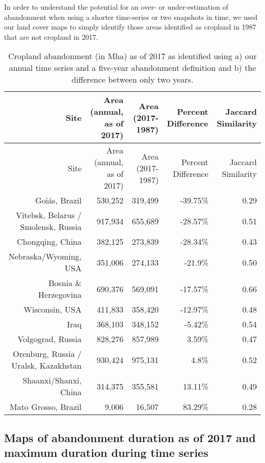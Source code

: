 \documentclass[9pt,twoside,lineno]{pnas-new}
\begin{document}
In order to understand the potential for an over- or under-estimation of abandonment when using a shorter time-series or two snapshots in time, we used our land cover maps to simply identify those areas identified as cropland in 1987 that are not cropland in 2017.

\newpage

\begin{longtable}[]{@{}rrrrr@{}}
\caption{\label{tab:twoyr-diff-table}Cropland abandonment (in Mha) as of 2017 as identified using a) our annual time series and a five-year abandonment definition and b) the difference between only two years.}\tabularnewline
\toprule
Site & Area (annual, as of 2017) & Area (2017-1987) & Percent Difference & Jaccard Similarity \\
\midrule
\endfirsthead
\toprule
Site & Area (annual, as of 2017) & Area (2017-1987) & Percent Difference & Jaccard Similarity \\
\midrule
\endhead
Goiás, Brazil & 530,252 & 319,499 & -39.75\% & 0.29 \\
Vitebsk, Belarus / Smolensk, Russia & 917,934 & 655,689 & -28.57\% & 0.51 \\
Chongqing, China & 382,125 & 273,839 & -28.34\% & 0.43 \\
Nebraska/Wyoming, USA & 351,006 & 274,133 & -21.9\% & 0.50 \\
Bosnia \& Herzegovina & 690,376 & 569,091 & -17.57\% & 0.66 \\
Wisconsin, USA & 411,833 & 358,420 & -12.97\% & 0.48 \\
Iraq & 368,103 & 348,152 & -5.42\% & 0.54 \\
Volgograd, Russia & 828,276 & 857,989 & 3.59\% & 0.47 \\
Orenburg, Russia / Uralsk, Kazakhstan & 930,424 & 975,131 & 4.8\% & 0.52 \\
Shaanxi/Shanxi, China & 314,375 & 355,581 & 13.11\% & 0.49 \\
Mato Grosso, Brazil & 9,006 & 16,507 & 83.29\% & 0.28 \\
\bottomrule
\end{longtable}

\newpage

\hypertarget{maps-of-abandonment-duration-as-of-2017-and-maximum-duration-during-time-series}{%
\subsection{Maps of abandonment duration as of 2017 and maximum duration during time series}\label{maps-of-abandonment-duration-as-of-2017-and-maximum-duration-during-time-series}}
\end{document}
